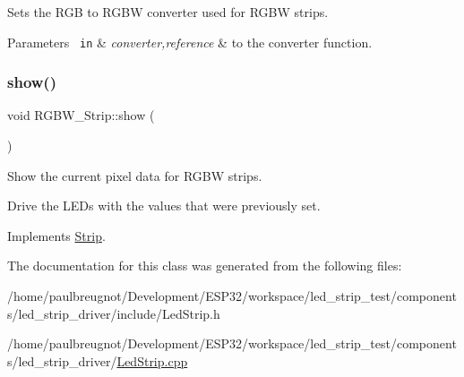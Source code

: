 Sets the R\+GB to R\+G\+BW converter used for R\+G\+BW strips. 


\begin{DoxyParams}[1]{Parameters}
\mbox{\texttt{ in}}  & {\em converter,reference} & to the converter function. \\
\hline
\end{DoxyParams}
\mbox{\label{classRGBW__Strip_a6951fd2265c832e98c9f02b5d3fb4af6}} 
\subsubsection{\texorpdfstring{show()}{show()}}
{\footnotesize\ttfamily void R\+G\+B\+W\+\_\+\+Strip\+::show (\begin{DoxyParamCaption}{ }\end{DoxyParamCaption})\hspace{0.3cm}{\ttfamily [virtual]}}



Show the current pixel data for R\+G\+BW strips. 

Drive the L\+E\+Ds with the values that were previously set. 

Implements \mbox{\hyperlink{classStrip}{Strip}}.



The documentation for this class was generated from the following files\+:\begin{DoxyCompactItemize}
\item 
/home/paulbreugnot/\+Development/\+E\+S\+P32/workspace/led\+\_\+strip\+\_\+test/components/led\+\_\+strip\+\_\+driver/include/Led\+Strip.\+h\item 
/home/paulbreugnot/\+Development/\+E\+S\+P32/workspace/led\+\_\+strip\+\_\+test/components/led\+\_\+strip\+\_\+driver/\mbox{\hyperlink{LedStrip_8cpp}{Led\+Strip.\+cpp}}\end{DoxyCompactItemize}
